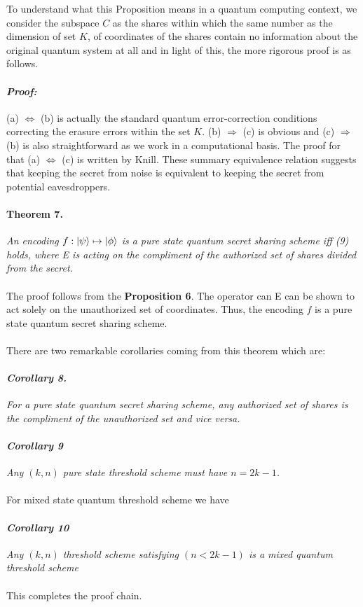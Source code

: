 \documentclass[12pt]{article}
\begin{document}
To understand what this Proposition means in a quantum computing context, we consider the subspace $C$ as the shares within which the same number as the dimension of set $K$, of coordinates of the shares contain no information about the original quantum system at all and in light of this, the more rigorous proof is as follows.
\paragraph{\textit{Proof:}}
(a) $\Leftrightarrow$ (b) is actually the standard quantum error-correction conditions correcting the erasure errors within the set $K$. (b) $\Rightarrow$ (c) is obvious and (c) $\Rightarrow$ (b) is also straightforward as we work in a computational basis. The proof for that (a) $\Leftrightarrow$ (c) is written by Knill\cite{Knill}. These summary equivalence relation suggests that keeping the secret from noise is equivalent to keeping the secret from potential eavesdroppers.
\paragraph{Theorem 7.}
\textit{An encoding $f:\ket{\psi} \mapsto \ket{\phi}$ is a pure state quantum secret sharing scheme iff (9) holds, where E is acting on the compliment of the authorized set of shares divided from the secret.}
\\\\
The proof follows from the \textbf{Proposition 6}. The operator can E can be shown to act solely on the unauthorized set of coordinates. Thus, the encoding $f$ is a pure state quantum secret sharing scheme.
\\\\
There are two remarkable corollaries coming from this theorem which are:
\paragraph{\textit{Corollary 8.}}
\textit{For a pure state quantum secret sharing scheme, any authorized set of shares is the compliment of the unauthorized set and vice versa.}
\paragraph{\textit{Corollary 9}}
\textit{Any $(k,n)$ pure state threshold scheme must have $n=2k-1$.}
\\\\
For mixed state quantum threshold scheme we have 
\paragraph{\textit{Corollary 10}}
\textit{Any $(k, n)$ threshold scheme satisfying $(n < 2k-1)$ is a mixed quantum threshold scheme}
\\\\
This completes the proof chain.



\end{document}
